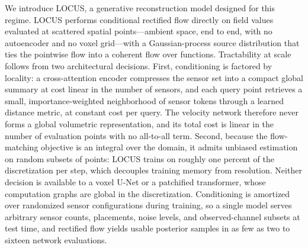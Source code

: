 \documentclass{article} %
\newcommand{\model}{LOCUS}
\begin{document}
We introduce \model{}, a generative reconstruction model designed for this regime. \model{} performs conditional rectified flow directly on field values evaluated at scattered spatial points---ambient space, end to end, with no autoencoder and no voxel grid---with a Gaussian-process source distribution that ties the pointwise flow into a coherent flow over functions. Tractability at scale follows from two architectural decisions. First, conditioning is factored by locality: a cross-attention encoder compresses the sensor set into a compact global summary at cost linear in the number of sensors, and each query point retrieves a small, importance-weighted neighborhood of sensor tokens through a learned distance metric, at constant cost per query. The velocity network therefore never forms a global volumetric representation, and its total cost is linear in the number of evaluation points with no all-to-all term. Second, because the flow-matching objective is an integral over the domain, it admits unbiased estimation on random subsets of points: \model{} trains on roughly one percent of the discretization per step, which decouples training memory from resolution. Neither decision is available to a voxel U-Net or a patchified transformer, whose computation graphs are global in the discretization. Conditioning is amortized over randomized sensor configurations during training, so a single model serves arbitrary sensor counts, placements, noise levels, and observed-channel subsets at test time, and rectified flow yields usable posterior samples in as few as two to sixteen network evaluations.
\end{document}
